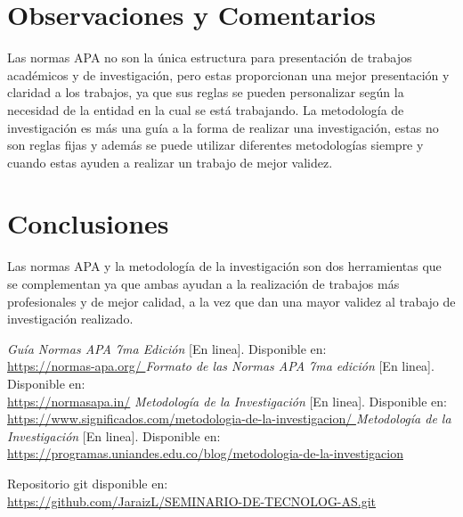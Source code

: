 \documentclass[12pt]{article}
\begin{document}
\section*{Observaciones y Comentarios}
Las normas APA no son la única estructura para presentación de trabajos académicos y de investigación, pero estas proporcionan una mejor presentación y claridad a los trabajos, ya que sus reglas se pueden personalizar según la necesidad de la entidad en la cual se está trabajando.
La metodología de investigación es más una guía a la forma de realizar una investigación, estas no son reglas fijas y además se puede utilizar diferentes metodologías siempre y cuando estas ayuden a realizar un trabajo de mejor validez.


\section*{Conclusiones}
Las normas APA y la metodología de la investigación son dos herramientas que se complementan ya que ambas ayudan a la realización de trabajos más profesionales y de mejor calidad, a la vez que dan una mayor validez al trabajo de investigación realizado.

\begin{thebibliography}{9}

\textit{Guía Normas APA 7ma Edición} [En linea]. Disponible en:\\ \url{https://normas-apa.org/ }
\textit{Formato de las Normas APA 7ma edición} [En linea]. Disponible en:\\ \url{https://normasapa.in/}
\textit{Metodología de la Investigación} [En linea]. Disponible en:\\ \url{https://www.significados.com/metodologia-de-la-investigacion/ }
\textit{Metodología de la Investigación} [En linea]. Disponible en:\\ \url{https://programas.uniandes.edu.co/blog/metodologia-de-la-investigacion }
\end{thebibliography}

Repositorio git disponible en:\\ \url{https://github.com/JaraizL/SEMINARIO-DE-TECNOLOG-AS.git}
\end{document}
